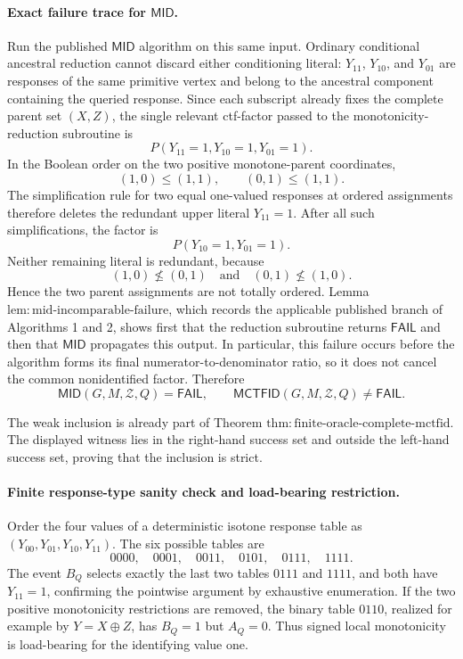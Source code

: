 \paragraph{Exact failure trace for \(\mathsf{MID}\).}
Run the published \(\mathsf{MID}\) algorithm on this same input.  Ordinary conditional ancestral reduction cannot discard either conditioning literal: \(Y_{11}\), \(Y_{10}\), and \(Y_{01}\) are responses of the same primitive vertex and belong to the ancestral component containing the queried response.  Since each subscript already fixes the complete parent set \((X,Z)\), the single relevant ctf-factor passed to the monotonicity-reduction subroutine is
\[
 P(Y_{11}=1,Y_{10}=1,Y_{01}=1).
\]
In the Boolean order on the two positive monotone-parent coordinates,
\[
 (1,0)\le(1,1),
 \qquad
 (0,1)\le(1,1).
\]
The simplification rule for two equal one-valued responses at ordered assignments therefore deletes the redundant upper literal \(Y_{11}=1\).  After all such simplifications, the factor is
\[
 P(Y_{10}=1,Y_{01}=1).
\]
Neither remaining literal is redundant, because
\[
 (1,0)\not\le(0,1)
 \quad\text{and}\quad
 (0,1)\not\le(1,0).
\]
Hence the two parent assignments are not totally ordered.  Lemma \(\mathrm{lem:mid\text{-}incomparable\text{-}failure}\), which records the applicable published branch of Algorithms 1 and 2, shows first that the reduction subroutine returns \(\mathsf{FAIL}\) and then that \(\mathsf{MID}\) propagates this output.  In particular, this failure occurs before the algorithm forms its final numerator-to-denominator ratio, so it does not cancel the common nonidentified factor.  Therefore
\[
 \mathsf{MID}(G,M,\mathcal Z,Q)=\mathsf{FAIL},
 \qquad
 \mathsf{MCTFID}(G,M,\mathcal Z,Q)\ne\mathsf{FAIL}.
\]

The weak inclusion is already part of Theorem \(\mathrm{thm:finite\text{-}oracle\text{-}complete\text{-}mctfid}\).  The displayed witness lies in the right-hand success set and outside the left-hand success set, proving that the inclusion is strict.

\paragraph{Finite response-type sanity check and load-bearing restriction.}
Order the four values of a deterministic isotone response table as \((Y_{00},Y_{01},Y_{10},Y_{11})\).  The six possible tables are
\[
 0000,\quad 0001,\quad 0011,\quad 0101,\quad 0111,\quad 1111.
\]
The event \(B_Q\) selects exactly the last two tables \(0111\) and \(1111\), and both have \(Y_{11}=1\), confirming the pointwise argument by exhaustive enumeration.  If the two positive monotonicity restrictions are removed, the binary table \(0110\), realized for example by \(Y=X\mathbin{\oplus}Z\), has \(B_Q=1\) but \(A_Q=0\).  Thus signed local monotonicity is load-bearing for the identifying value one.